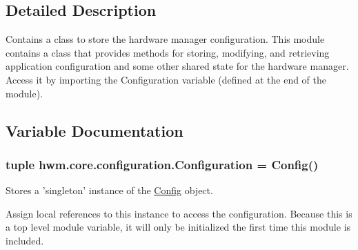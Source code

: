 \subsection{Detailed Description}
Contains a class to store the hardware manager configuration. This module contains a class that provides methods for storing, modifying, and retrieving application configuration and some other shared state for the hardware manager. Access it by importing the Configuration variable (defined at the end of the module). 

\subsection{Variable Documentation}
\hypertarget{namespacehwm_1_1core_1_1configuration_a87c77155d12f2ea9ccfb44c9602cb86a}{
\subsubsection[{Configuration}]{\setlength{\rightskip}{0pt plus 5cm}tuple hwm.\-core.\-configuration.\-Configuration = {\bf Config}()}}\label{namespacehwm_1_1core_1_1configuration_a87c77155d12f2ea9ccfb44c9602cb86a}


Stores a 'singleton' instance of the \hyperlink{classhwm_1_1core_1_1configuration_1_1_config}{Config} object. 

Assign local references to this instance to access the configuration. Because this is a top level module variable, it will only be initialized the first time this module is included. 